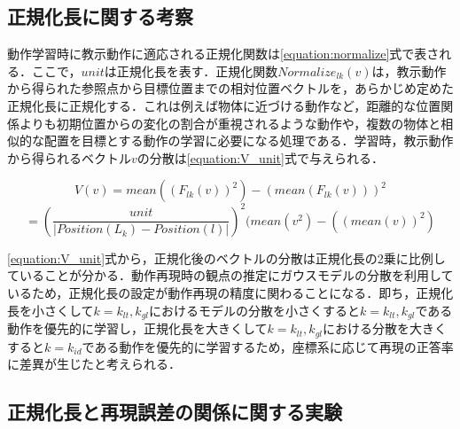\subsection{正規化長に関する考察}

動作学習時に教示動作に適応される正規化関数は\ref{equation:normalize}式で表される．ここで，$unit$は正規化長を表す．正規化関数$Normalize_{lk}(v)$は，教示動作から得られた参照点から目標位置までの相対位置ベクトルを，あらかじめ定めた正規化長に正規化する．これは例えば物体に近づける動作など，距離的な位置関係よりも初期位置からの変化の割合が重視されるような動作や，複数の物体と相似的な配置を目標とする動作の学習に必要になる処理である．学習時，教示動作から得られるベクトル$v$の分散は\ref{equation:V_unit}式で与えられる．

\[
	\label{equation:V_unit}
	V(v) = mean((F_{lk}(v))^{2}) - (mean(F_{lk}(v)))^{2}
\]
\begin{equation}
	 = \left(\frac{unit}{| Position(L_{k})-Position(l) |}\right)^{2}(mean(v^{2}) - ((mean(v))^{2})
\end{equation}

\ref{equation:V_unit}式から，正規化後のベクトルの分散は正規化長の2乗に比例していることが分かる．動作再現時の観点の推定にガウスモデルの分散を利用しているため，正規化長の設定が動作再現の精度に関わることになる．即ち，正規化長を小さくして$k=k_{lt} , k_{gl}$におけるモデルの分散を小さくすると$k=k_{lt} , k_{gl}$である動作を優先的に学習し，正規化長を大きくして$k=k_{lt} , k_{gl}$における分散を大きくすると$k=k_{id}$である動作を優先的に学習するため，座標系に応じて再現の正答率に差異が生じたと考えられる．

\subsection{正規化長と再現誤差の関係に関する実験}

